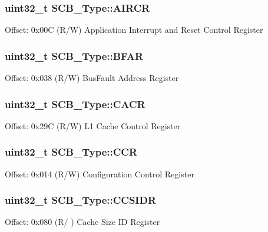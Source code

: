 \subsubsection[{\texorpdfstring{A\+I\+R\+CR}{AIRCR}}]{ uint32\+\_\+t S\+C\+B\+\_\+\+Type\+::\+A\+I\+R\+CR}\hypertarget{structSCB__Type_a6ed3c9064013343ea9fd0a73a734f29d}{}\label{structSCB__Type_a6ed3c9064013343ea9fd0a73a734f29d}
Offset\+: 0x00C (R/W) Application Interrupt and Reset Control Register 
\subsubsection[{\texorpdfstring{B\+F\+AR}{BFAR}}]{ uint32\+\_\+t S\+C\+B\+\_\+\+Type\+::\+B\+F\+AR}\hypertarget{structSCB__Type_a31f79afe86c949c9862e7d5fce077c3a}{}\label{structSCB__Type_a31f79afe86c949c9862e7d5fce077c3a}
Offset\+: 0x038 (R/W) Bus\+Fault Address Register 
\subsubsection[{\texorpdfstring{C\+A\+CR}{CACR}}]{ uint32\+\_\+t S\+C\+B\+\_\+\+Type\+::\+C\+A\+CR}\hypertarget{structSCB__Type_acc2c89b1b03bed0224952b05582ce397}{}\label{structSCB__Type_acc2c89b1b03bed0224952b05582ce397}
Offset\+: 0x29C (R/W) L1 Cache Control Register 
\subsubsection[{\texorpdfstring{C\+CR}{CCR}}]{ uint32\+\_\+t S\+C\+B\+\_\+\+Type\+::\+C\+CR}\hypertarget{structSCB__Type_a6d273c6b90bad15c91dfbbad0f6e92d8}{}\label{structSCB__Type_a6d273c6b90bad15c91dfbbad0f6e92d8}
Offset\+: 0x014 (R/W) Configuration Control Register 
\subsubsection[{\texorpdfstring{C\+C\+S\+I\+DR}{CCSIDR}}]{ uint32\+\_\+t S\+C\+B\+\_\+\+Type\+::\+C\+C\+S\+I\+DR}\hypertarget{structSCB__Type_a5b8ace34dde093049c26c56c9e3819cc}{}\label{structSCB__Type_a5b8ace34dde093049c26c56c9e3819cc}
Offset\+: 0x080 (R/ ) Cache Size ID Register 

